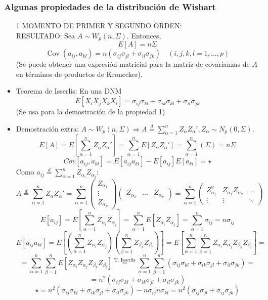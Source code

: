 \documentclass[11pt,a4paper]{article}
\begin{document}
\subsubsection{Algunas propiedades de la distribución de Wishart}
\begin{itemize}
\item[1] MOMENTO DE PRIMER Y SEGUNDO ORDEN: \\
RESULTADO: Sea $A \sim W_{p}(n, \Sigma)$. Entonces,
$$E[A] = n \Sigma$$
$$\operatorname{Cov}(a_{ij}, a_{kl}) = n(\sigma_{ij}\sigma_{jl} + \sigma_{il}\sigma_{jk}) \quad (i, j, k, l = 1, \dots, p)$$
(Se puede obtener una expresión matricial para la matriz de covarianzas de $A$ en términos de productos de Kronecker).

\item Teorema de Isserlis: En una DNM
$$E[X_{i}X_{j}X_{k}X_{l}] = \sigma_{ij}\sigma_{kl} + \sigma_{ik}\sigma_{kl} + \sigma_{il}\sigma_{jk}$$
(Se usa para la demostración de la propiedad 1)

\item Demostración extra: $A \sim W_{p}(n, \Sigma) \Rightarrow A \overset{d}{=} \sum_{\alpha=1}^{n} Z_{\alpha}Z_{\alpha}', Z_{\alpha} \sim N_{p}(0, \Sigma)$.
$$E[A] = E[\sum_{\alpha=1}^{n} Z_{\alpha}Z_{\alpha}'] = \sum_{\alpha=1}^{n} E[Z_{\alpha}Z_{\alpha}'] = \sum_{\alpha=1}^{n}(\Sigma) = n\Sigma$$
$$Cov[a_{ij}, a_{kl}] = E[a_{ij}a_{kl}] - E[a_{ij}]E[a_{kl}] = \star$$
Como $a_{ij} \overset{d}{=} \sum_{\alpha=1}^{n} Z_{\alpha_{i}}Z_{\alpha_{j}}$:
$$A \overset{d}{=} \sum_{\alpha=1}^{n} Z_{\alpha}Z_{\alpha}' = \sum_{\alpha=1}^{n} \begin{pmatrix} Z_{\alpha_{1}} \\ \vdots \\ Z_{\alpha_{p}} \end{pmatrix} \begin{pmatrix} Z_{\alpha_{1}} & \dots & Z_{\alpha_{p}} \end{pmatrix} = \sum_{\alpha=1}^{n} \begin{pmatrix}
Z_{\alpha_{1}}^{2} & Z_{\alpha_{1}}Z_{\alpha_{2}} & \dots \\
\vdots & \vdots & \ddots
\end{pmatrix}$$
$$E[a_{ij}] = E[\sum_{\alpha=1}^{n}Z_{\alpha_{i}}Z_{\alpha_{j}}] = \sum_{\alpha=1}^{n} E[Z_{\alpha_{i}}Z_{\alpha_{j}}] = \sum_{\alpha=1}^{n} \sigma_{ij} = n\sigma_{ij}$$
$$E[a_{ij}a_{kl}] = E[(\sum_{\alpha=1}^{n} Z_{\alpha_{i}}Z_{\alpha_{j}})(\sum_{\beta=1}^{n}Z_{\beta_{k}}Z_{\beta_{l}})] = E[\sum_{\alpha=1}^{n} \sum_{\beta=1}^{n} Z_{\alpha_{i}}Z_{\alpha_{j}} Z_{\beta_{k}} Z_{\beta_{l}}] =$$
$$= \sum_{\alpha=1}^{n} \sum_{\beta=1}^{n} E[Z_{\alpha_{i}} Z_{\alpha_{j}} Z_{\beta_{k}} Z_{\beta_{l}}] \overset{\text{T. Isserlis}}{=} \sum_{\alpha=1}^{n} \sum_{\beta=1}^{n} (\sigma_{ij}\sigma_{kl} + \sigma_{ik}\sigma_{jl} + \sigma_{il}\sigma_{jk}) =$$
$$= n^{2} (\sigma_{ij}\sigma_{kl} + \sigma_{ik}\sigma_{jl} + \sigma_{il}\sigma_{jk})$$
$$\star = n^{2}(\sigma_{ij}\sigma_{kl} + \sigma_{ik}\sigma_{jl} + \sigma_{il}\sigma_{jk}) - n\sigma_{ij}n\sigma_{kl} = n^{2}(\sigma_{ij}\sigma_{jl} + \sigma_{ij}\sigma_{jk})$$


\end{itemize}
\end{document}
